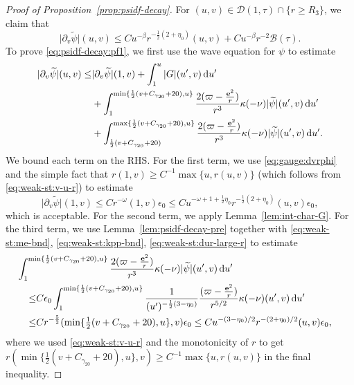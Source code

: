 \documentclass[10pt, reqno]{amsart}
\theoremstyle{definition}
\theoremstyle{remark}
\theoremstyle{conjecture}
\numberwithin{equation}{section}
\newcommand{\abs}[1]{\vert#1\vert}
\newcommand{\set}[1]{\{#1\}}
\newcommand{\ud}{\mathrm{d}}
\newcommand{\rd}{\partial}
\newcommand{\0}{\emptyset}
\newcommand{\bt}{\beta}
\newcommand{\gmm}{\gamma}
\newcommand{\eps}{\epsilon}
\newcommand{\kpp}{\kappa}
\newcommand{\omg}{\omega}
\newcommand{\bfe}{{\bf e}}
\newcommand{\calB}{\mathcal B}
\newcommand{\calD}{\mathcal D}
\newcommand{\dur}{\nu}
\newcommand{\e}{\bfe}							%
\newcommand{\psibg}{\overline{\psi}}				%
\newcommand{\psidf}{\widetilde{\psi}}				%
\begin{document}
\begin{proof}[Proof of Proposition~\ref{prop:psidf-decay}]
For $(u,v)\in \calD(1, \tau) \cap \set{r \geq R_{3}}$, we claim that
\begin{equation} \label{eq:psidf-decay:pf1}
	\abs{\rd_{v} \psidf}(u, v) \leq C u^{-\bt} r^{-\frac{1}{2}(2 + \eta_{0})}(u, v) + C u^{-\bt} r^{-2} \calB(\tau).
\end{equation}
To prove \eqref{eq:psidf-decay:pf1}, we first use the wave equation for $\psi$ to estimate
\begin{align*}
	\abs{\rd_{v} \psidf}(u,v)
	\leq & \abs{\rd_{v} \psidf}(1,v) + \int_{1}^{u} \abs{G} (u', v) \, \ud u' \\
	& + \int_{1}^{\min\set{\frac{1}{2}(v + C_{\gmm_{20}}+20), u}} \frac{2 (\varpi - \frac{\e^{2}}{r})}{r^{3}} \kpp (-\dur) \abs{\psidf} (u', v) \, \ud u' \\
	& + \int_{\frac{1}{2}(v + C_{\gmm_{20}}+20)}^{\max\set{\frac{1}{2}(v + C_{\gmm_{20}}+20), u}} \frac{2 (\varpi - \frac{\e^{2}}{r})}{r^{3}} \kpp (-\dur) \abs{\psidf} (u', v) \, \ud u' .
\end{align*}
We bound each term on the RHS. For the first term, we use \eqref{eq:gauge:dvrphi} and the simple fact that $r(1, v) \geq C^{-1} \max\set{u, r(u, v)}$ (which follows from \eqref{eq:weak-st:v-u-r}) to estimate
\begin{equation*}
	\abs{\rd_{v} \psidf}(1, v) \leq C r^{-\omg}(1, v) \eps_{0} \leq C u^{-\omg+1+\frac{1}{2}\eta_{0}} r^{-\frac{1}{2}(2+\eta_{0})}(u, v) \eps_{0},
\end{equation*}
which is acceptable. For the second term, we apply Lemma~\ref{lem:int-char-G}. For the third term, we use Lemma~\ref{lem:psidf-decay-pre} together with \eqref{eq:weak-st:me-bnd}, \eqref{eq:weak-st:kpp-bnd}, \eqref{eq:weak-st:dur-large-r} to estimate
\begin{align*}
& \hskip-2em
\int_{1}^{\min\set{\frac{1}{2}(v + C_{\gmm_{20}}+20), u}} \frac{2 (\varpi - \frac{\e^{2}}{r})}{r^{3}} \kpp (-\dur) \abs{\psidf} (u', v) \, \ud u' \\
\leq & C \eps_{0} \int_{1}^{\min\set{\frac{1}{2}(v + C_{\gmm_{20}}+20), u}} \frac{1}{(u')^{-\frac{1}{2}(3-\eta_{0})}}\frac{(\varpi - \frac{\e^{2}}{r})}{r^{5/2}} \kpp (-\dur) (u', v) \, \ud u' \\
\leq & C r^{-\frac{5}{2}}(\min\set{\tfrac{1}{2}(v + C_{\gmm_{20}}+20), u}, v) \eps_{0}
\leq C u^{-(3-\eta_{0})/2} r^{-(2+\eta_{0})/2}(u,v) \eps_{0},
\end{align*}
where we used \eqref{eq:weak-st:v-u-r} and the monotonicity of $r$ to get $r(\min\set{\tfrac{1}{2}(v + C_{\gmm_{20}}+20), u}, v)\geq C^{-1}\max\{u, r(u,v)\}$ in the final inequality.

\end{proof}
\end{document}
